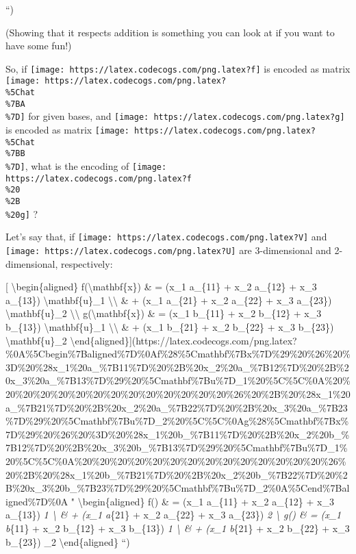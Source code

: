 \documentclass[]{article}
\begin{document}
``)

(Showing that it respects addition is something you can look at if you want to
have some fun!)

So, if \texttt{[image: https://latex.codecogs.com/png.latex?f]} is encoded as
matrix \texttt{[image: https://latex.codecogs.com/png.latex?\\\%5Chat\\\%7BA\\\%7D]}
for given bases, and \texttt{[image: https://latex.codecogs.com/png.latex?g]} is
encoded as matrix
\texttt{[image: https://latex.codecogs.com/png.latex?\\\%5Chat\\\%7BB\\\%7D]}, what is
the encoding of
\texttt{[image: https://latex.codecogs.com/png.latex?f\\\%20\\\%2B\\\%20g]} ?

Let's say that, if \texttt{[image: https://latex.codecogs.com/png.latex?V]} and
\texttt{[image: https://latex.codecogs.com/png.latex?U]} are 3-dimensional and
2-dimensional, respectively:

{[} \textbackslash{}begin\{aligned\} f(\textbackslash{}mathbf\{x\}) \& = (x\_1
a\_\{11\} + x\_2 a\_\{12\} + x\_3 a\_\{13\}) \textbackslash{}mathbf\{u\}\_1
\textbackslash{}\textbackslash{} \& + (x\_1 a\_\{21\} + x\_2 a\_\{22\} + x\_3
a\_\{23\}) \textbackslash{}mathbf\{u\}\_2 \textbackslash{}\textbackslash{}
g(\textbackslash{}mathbf\{x\}) \& = (x\_1 b\_\{11\} + x\_2 b\_\{12\} + x\_3
b\_\{13\}) \textbackslash{}mathbf\{u\}\_1 \textbackslash{}\textbackslash{} \& +
(x\_1 b\_\{21\} + x\_2 b\_\{22\} + x\_3 b\_\{23\})
\textbackslash{}mathbf\{u\}\_2
\textbackslash{}end\{aligned\}{]}(https://latex.codecogs.com/png.latex?\%0A\%5Cbegin\%7Baligned\%7D\%0Af\%28\%5Cmathbf\%7Bx\%7D\%29\%20\%26\%20\%3D\%20\%28x\_1\%20a\_\%7B11\%7D\%20\%2B\%20x\_2\%20a\_\%7B12\%7D\%20\%2B\%20x\_3\%20a\_\%7B13\%7D\%29\%20\%5Cmathbf\%7Bu\%7D\_1\%20\%5C\%5C\%0A\%20\%20\%20\%20\%20\%20\%20\%20\%20\%20\%20\%20\%20\%20\%26\%20\%2B\%20\%28x\_1\%20a\_\%7B21\%7D\%20\%2B\%20x\_2\%20a\_\%7B22\%7D\%20\%2B\%20x\_3\%20a\_\%7B23\%7D\%29\%20\%5Cmathbf\%7Bu\%7D\_2\%20\%5C\%5C\%0Ag\%28\%5Cmathbf\%7Bx\%7D\%29\%20\%26\%20\%3D\%20\%28x\_1\%20b\_\%7B11\%7D\%20\%2B\%20x\_2\%20b\_\%7B12\%7D\%20\%2B\%20x\_3\%20b\_\%7B13\%7D\%29\%20\%5Cmathbf\%7Bu\%7D\_1\%20\%5C\%5C\%0A\%20\%20\%20\%20\%20\%20\%20\%20\%20\%20\%20\%20\%20\%20\%26\%20\%2B\%20\%28x\_1\%20b\_\%7B21\%7D\%20\%2B\%20x\_2\%20b\_\%7B22\%7D\%20\%2B\%20x\_3\%20b\_\%7B23\%7D\%29\%20\%5Cmathbf\%7Bu\%7D\_2\%0A\%5Cend\%7Baligned\%7D\%0A
" \textbackslash{}begin\{aligned\} f() \& = (x\_1 a\_\{11\} + x\_2
a\_\{12\} + x\_3 a\_\{13\}) \emph{1 \textbackslash{} \& + (x\_1
a}\{21\} + x\_2 a\_\{22\} + x\_3 a\_\{23\}) \emph{2 \textbackslash{}
g() \& = (x\_1 b}\{11\} + x\_2 b\_\{12\} + x\_3 b\_\{13\})
\emph{1 \textbackslash{} \& + (x\_1 b}\{21\} + x\_2 b\_\{22\} + x\_3
b\_\{23\}) \_2 \textbackslash{}end\{aligned\} ``)
\end{document}
